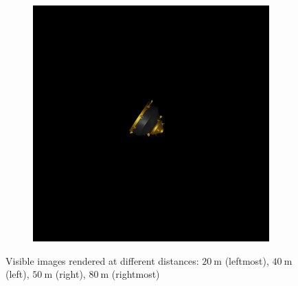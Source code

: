 \begin{figure}[!h]
\begin{subfigure}{0.24\linewidth}
    \end{subfigure}\hfill
    \begin{subfigure}{0.24\linewidth}
        \centering
        \includegraphics[width=\linewidth]{Images/VIS80m.png}
    \end{subfigure}
    \caption[Visible images rendered at different distances]{Visible images rendered at different distances: $\SI{20}{\meter}$ (leftmost), $\SI{40}{\meter}$ (left), $\SI{50}{\meter}$ (right), $\SI{80}{\meter}$ (rightmost)}
    \label{fig:VISdistance}
\end{figure}
